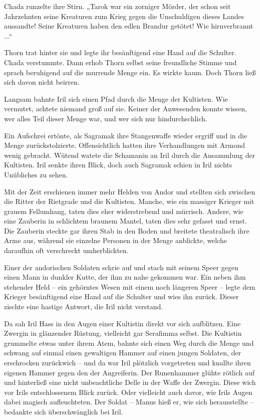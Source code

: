 Chada runzelte ihre Stirn. „Tarok war ein zorniger Mörder, der schon seit Jahrzehnten seine Kreaturen zum Krieg gegen die Unschuldigen dieses Landes aussandte! Seine Kreaturen haben den edlen Brandur getötet! Wie hirnverbrannt ...“

Thorn trat hinter sie und legte ihr besänftigend eine Hand auf die Schulter. Chada verstummte. Dann erhob Thorn selbst seine freundliche Stimme und sprach beruhigend auf die murrende Menge ein. Es wirkte kaum. Doch Thorn ließ sich davon nicht beirren.

Langsam bahnte Iril sich einen Pfad durch die Menge der Kultisten. Wie vermutet, achtete niemand groß auf sie. Keiner der Anwesenden konnte wissen, wer alles Teil dieser Menge war, und wer sich nur hindurchschlich.

Ein Aufschrei ertönte, als Sagramak ihre Stangenwaffe wieder ergriff und in die Menge zurückstolzierte. Offensichtlich hatten ihre Verhandlungen mit Armond wenig gebracht. Wütend watete die Schamanin an Iril durch die Ansammlung der Kultisten. Iril senkte ihren Blick, doch auch Sagramak schien in Iril nichts Unübliches zu sehen.

Mit der Zeit erschienen immer mehr Helden von Andor und stellten sich zwischen die Ritter der Rietgrade und die Kultisten. Manche, wie ein massiger Krieger mit grauem Fellumhang, taten dies eher widerstrebend und mürrisch. Andere, wie eine Zauberin in schlichtem braunem Mantel, taten dies sehr gefasst und ernst. Die Zauberin steckte gar ihren Stab in den Boden und breitete theatralisch ihre Arme aus, während sie einzelne Personen in der Menge anblickte, welche daraufhin oft verschreckt umherblickten.

Einer der andorischen Soldaten schrie auf und stach mit seinem Speer gegen einen Mann in dunkler Kutte, der ihm zu nahe gekommen war. Ein neben ihm stehender Held – ein gehörntes Wesen mit einem noch längeren Speer – legte dem Krieger besänftigend eine Hand auf die Schulter und wies ihn zurück. Dieser zischte eine hastige Antwort, die Iril nicht verstand.

Da sah Iril Hass in den Augen einer Kultistin direkt vor sich aufblitzen. Eine Zwergin in glänzender Rüstung, vielleicht gar Serafimma selbst. Die Kultistin grummelte etwas unter ihrem Atem, bahnte sich einen Weg durch die Menge und schwang auf einmal einen gewaltigen Hammer auf einen jungen Soldaten, der erschrocken zurückwich – und da war Iril plötzlich vorgetreten und knallte ihren eigenen Hammer gegen den der Angreiferin. Der Runenhammer glühte rötlich auf und hinterließ eine nicht unbeachtliche Delle in der Waffe der Zwergin. Diese wich vor Irils entschlossenem Blick zurück. Oder vielleicht auch davor, wie Irils Augen dabei magisch aufleuchteten. Der Soldat – Manus hieß er, wie sich herausstellte – bedankte sich überschwänglich bei Iril.

